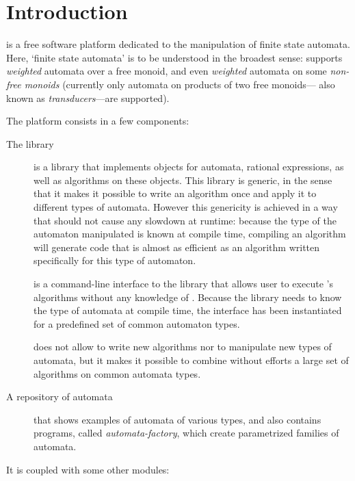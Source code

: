 \chapter*{Introduction}

\vcsn is a free software platform dedicated to the manipulation of
finite state automata.  Here, `finite state automata' is to be
understood in the broadest sense: \vcsn supports \emph{weighted}
automata over a free monoid, and even \emph{weighted} automata on some
\emph{non-free monoids} (currently only automata on products of two
free monoids--- also known as \emph{transducers}---are supported).

\bigskip

The platform consists in a few components:

\begin{description}
\item[The \vcsn library] is a \Cxx library that implements objects for
  automata, rational expressions, as well as algorithms on these
  objects.  This library is generic, in the sense that it makes it
  possible to write an algorithm once and apply it to different types
  of automata.  However this genericity is achieved in a way that
  should not cause any slowdown at runtime: because the type of the
  automaton manipulated is known at compile time, compiling an
  algorithm will generate code that is almost as efficient as an
  algorithm written specifically for this type of automaton.

\item[\tafkit] is a command-line interface to the library that allows
  user to execute \vcsn's algorithms without any knowledge of \Cxx.
  Because the \vcsn library needs to know the type of automata at
  compile time, the \tafkit interface has been instantiated for a
  predefined set of common automaton types.

  \tafkit does not allow to write new algorithms nor to manipulate new
  types of automata, but it makes it possible to combine without
  efforts a large set of algorithms on common automata types.

\item[A repository of automata] that shows examples of automata of
  various types, and also contains programs, called 
  \emph{automata-factory}, which create parametrized families of
  automata.

\end{description}
It is coupled with some other modules:

